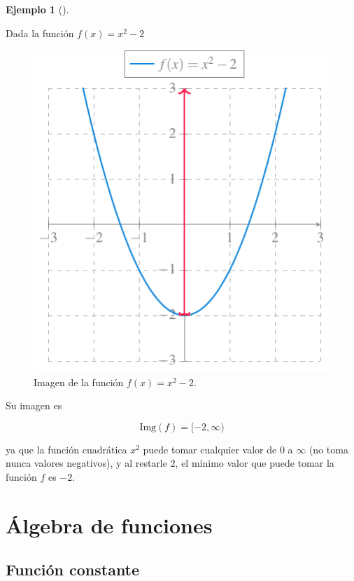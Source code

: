 \documentclass[
  a4paper,
]{scrreport}
\theoremstyle{definition}
\newtheorem{example}{Ejemplo}[chapter]
\theoremstyle{plain}
\theoremstyle{definition}
\theoremstyle{definition}
\theoremstyle{plain}
\theoremstyle{plain}
\theoremstyle{remark}
\begin{document}
\begin{example}[]\protect\hypertarget{exm-imagen-funcion}{}\label{exm-imagen-funcion}

Dada la función \(f(x)=x^2-2\)

\begin{figure}[H]

{\centering \includegraphics{./img/funciones/ejemplo-imagen.pdf}

}

\caption{Imagen de la función \(f(x)=x^2-2\).}

\end{figure}%

Su imagen es

\[\mbox{Img}(f)=[-2,\infty)\]

ya que la función cuadrática \(x^2\) puede tomar cualquier valor de
\(0\) a \(\infty\) (no toma nunca valores negativos), y al restarle 2,
el mínimo valor que puede tomar la función \(f\) es \(-2\).

\end{example}

\section{Álgebra de funciones}\label{uxe1lgebra-de-funciones}

\subsection{Función constante}\label{funciuxf3n-constante}
\end{document}
